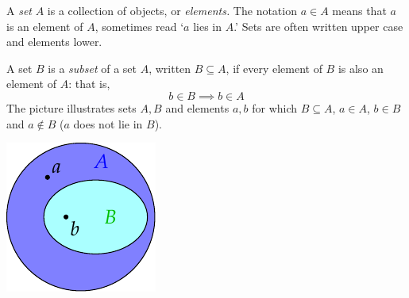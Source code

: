 \begin{defn}{}{}
	A \emph{set} $A$ is a collection of objects, or \emph{elements.}\footnotemark{} The notation $a\in A$ means that $a$ is an element of $A$, sometimes read `$a$ lies in $A$.' Sets are often written upper case and elements lower.\par
	\begin{minipage}[t]{0.75\linewidth}\vspace{-5pt}
		A set $B$ is a \emph{subset} of a set $A$, written $B\subseteq A$, if every element of $B$ is also an element of $A$: that is,
		\[
			b\in B\implies b\in A
		\]
		The picture illustrates sets $A,B$ and elements $a,b$ for which $B\subseteq A$, $a\in A$, $b\in B$ and $a\notin B$ ($a$ does not lie in $B$).
	\end{minipage}
	\hfill
	\begin{minipage}[t]{0.24\linewidth}\vspace{-6pt}
		\flushright
		\includegraphics[scale=0.95]{functions-subset}
	\end{minipage}
\end{defn}



